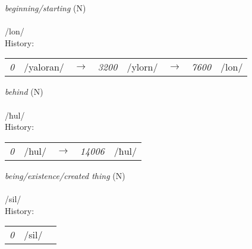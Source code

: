 \vspace{15pt}
\begin{nopagebreak}
 \textit{beginning/starting} (N)\\
\\
\noindent /l{\textprimstress}on/\\


\noindent History:

\vspace{-0pt}
\hspace{40pt}
\begin{tabular}{ccc}
\textit{0} & /yaloran/&$\rightarrow$ & \textit{3200} & /ylorn/&$\rightarrow$ & \textit{7600} & /lon/& \\
\end{tabular}

\vspace{20pt}\hline

\end{nopagebreak}
\filbreak



\vspace{15pt}
\begin{nopagebreak}
 \textit{behind} (N)\\
\\
\noindent /ħ{\textprimstress}ul/\\


\noindent History:

\vspace{-0pt}
\hspace{40pt}
\begin{tabular}{ccc}
\textit{0} & /hul/&$\rightarrow$ & \textit{14006} & /ħul/& \\
\end{tabular}

\vspace{20pt}\hline

\end{nopagebreak}
\filbreak



\vspace{15pt}
\begin{nopagebreak}
 \textit{being/existence/created thing} (N)\\
\\
\noindent /s{\textprimstress}il/\\


\noindent History:

\vspace{-0pt}
\hspace{40pt}
\begin{tabular}{ccc}
\textit{0} & /sil/& \\
\end{tabular}

\vspace{20pt}\hline

\end{nopagebreak}
\filbreak



